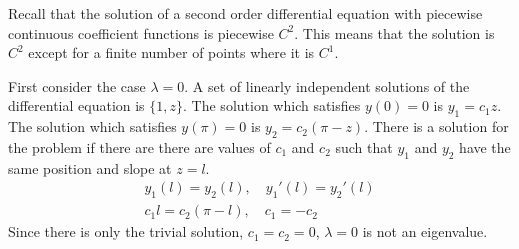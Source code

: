 {\begin{Solution}
  Recall that the solution of a second order differential equation with
  piecewise continuous coefficient functions is piecewise $C^2$.  
  This means that the solution is $C^2$ except for a finite number of points
  where it is $C^1$.

  First consider the case $\lambda = 0$.  A set of linearly independent
  solutions of the differential equation is $\{1,z\}$.  The solution which
  satisfies $y(0) = 0$ is $y_1 = c_1 z$. The solution which
  satisfies $y(\pi) = 0$ is $y_2 = c_2 (\pi-z)$. There is a solution for
  the problem if there are there are values of $c_1$ and $c_2$ such 
  that $y_1$ and $y_2$ have the same position and slope at $z = l$.
  \begin{gather*}
    y_1(l) = y_2(l), \quad y_1'(l) = y_2'(l) \\
    c_1 l = c_2 (\pi - l), \quad c_1 = -c_2 
  \end{gather*}
  Since there is only the trivial solution, $c_1 = c_2 = 0$, $\lambda = 0$ is
  not an eigenvalue.





\end{Solution}}
